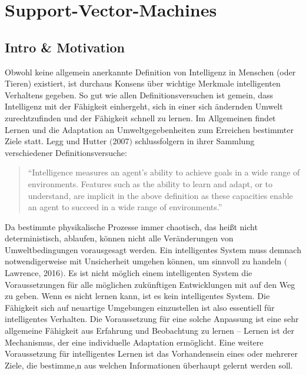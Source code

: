 \chapter{Support-Vector-Machines}
\usetikzlibrary{calc}
\usetikzlibrary{positioning}
\usetikzlibrary{matrix}

\section{Intro \& Motivation}
Obwohl keine allgemein anerkannte Definition von Intelligenz in Menschen (oder
Tieren) existiert, ist durchaus Konsens über wichtige Merkmale intelligenten
Verhaltens gegeben. So gut wie allen Definitionsversuchen ist gemein, dass Intelligenz
mit der Fähigkeit einhergeht, sich in einer sich ändernden Umwelt zurechtzufinden
und der Fähigkeit schnell zu lernen. Im Allgemeinen findet Lernen und die Adaptation
an Umweltgegebenheiten zum Erreichen bestimmter Ziele statt. Legg und Hutter
$($2007$)$ schlussfolgern in ihrer Sammlung verschiedener Definitionsversuche:

\begin{quote}
``Intelligence measures an agent’s ability to achieve goals in a wide range of
  environments. Features such as the ability to learn and adapt, or to understand,
  are implicit in the above definition as these capacities enable an agent to succeed
  in a wide range of environments.''
\end{quote}

Da bestimmte physikalische Prozesse immer chaotisch, das heißt nicht deterministisch,
ablaufen, können nicht alle Veränderungen von Umweltbedingungen vorausgesagt
werden. Ein intelligentes System muss demnach notwendigerweise mit Unsicherheit umgehen
können, um sinnvoll zu handeln $($Lawrence, 2016$)$. Es ist nicht möglich einem
intelligenten System die Voraussetzungen für alle möglichen zukünftigen Entwicklungen
mit auf den Weg zu geben. Wenn es nicht lernen kann, ist es kein intelligentes
System.  Die Fähigkeit sich auf neuartige Umgebungen einzustellen ist also essentiell
für intelligentes Verhalten. Die Voraussetzung für eine solche Anpassung ist eine
sehr allgemeine Fähigkeit aus Erfahrung und Beobachtung zu lernen -- Lernen ist der
Mechanismus, der eine individuelle Adaptation ermöglicht. Eine weitere Voraussetzung
für intelligentes Lernen ist das Vorhandensein eines oder mehrerer Ziele, die
bestimme,n aus welchen Informationen überhaupt gelernt werden soll.


